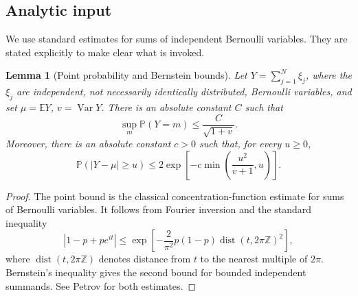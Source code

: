 \documentclass[11pt]{article}
\newtheorem{lemma}[theorem]{Lemma}
\theoremstyle{remark}
\newcommand{\Pp}{\mathbb P}
\newcommand{\Ee}{\mathbb E}
\newcommand{\Var}{\operatorname{Var}}
\begin{document}
\subsection{Analytic input}
We use standard estimates for sums of independent Bernoulli variables.  They are stated explicitly to make clear what is invoked.

\begin{lemma}[Point probability and Bernstein bounds]\label{lem:bernstein-point}
Let \(Y=\sum_{j=1}^N \xi_j\), where the \(\xi_j\) are independent, not necessarily identically distributed, Bernoulli variables, and set \(\mu=\Ee Y\), \(v=\Var Y\).  There is an absolute constant \(C\) such that
\[
        \sup_m \Pp(Y=m)\le \frac{C}{\sqrt{1+v}}.
\]
Moreover, there is an absolute constant \(c>0\) such that, for every \(u\ge0\),
\[
        \Pp(|Y-\mu|\ge u)\le
        2\exp\left[-c\min\left(\frac{u^2}{v+1},u\right)\right].
\]
\end{lemma}

\begin{proof}
The point bound is the classical concentration-function estimate for sums of Bernoulli variables.  It follows from Fourier inversion and the standard inequality
\[
        |1-p+pe^{it}|
        \le \exp\left[-\frac{2}{\pi^2}p(1-p)\operatorname{dist}(t,2\pi\mathbb Z)^2\right],
\]
where \(\operatorname{dist}(t,2\pi\mathbb Z)\) denotes distance from \(t\) to the nearest multiple of \(2\pi\).  Bernstein's inequality gives the second bound for bounded independent summands.  See Petrov \cite[Chapter VII]{Petrov1975} for both estimates.
\end{proof}
\end{document}
